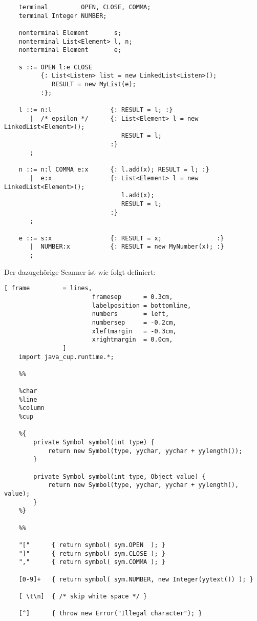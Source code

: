 \documentclass{article}
\begin{document}
\begin{enumerate}
\begin{Verbatim}
    terminal         OPEN, CLOSE, COMMA;
    terminal Integer NUMBER;
    
    nonterminal Element       s;
    nonterminal List<Element> l, n;
    nonterminal Element       e;
    
    s ::= OPEN l:e CLOSE  
          {: List<Listen> list = new LinkedList<Listen>();
             RESULT = new MyList(e);
          :};
    
    l ::= n:l                {: RESULT = l; :}
       |  /* epsilon */      {: List<Element> l = new LinkedList<Element>(); 
                                RESULT = l; 
                             :}
       ;
    
    n ::= n:l COMMA e:x      {: l.add(x); RESULT = l; :}
       |  e:x                {: List<Element> l = new LinkedList<Element>(); 
                                l.add(x);
                                RESULT = l; 
                             :}
       ;
    
    e ::= s:x                {: RESULT = x;               :}
       |  NUMBER:x           {: RESULT = new MyNumber(x); :}
       ;
      \end{Verbatim}
      \pagebreak

      Der dazugeh\"orige Scanner ist wie folgt definiert:
      \begin{Verbatim}[ frame         = lines, 
                        framesep      = 0.3cm, 
                        labelposition = bottomline,
                        numbers       = left,
                        numbersep     = -0.2cm,
                        xleftmargin   = -0.3cm,
                        xrightmargin  = 0.0cm,
                ]
    import java_cup.runtime.*;
          
    %%
       
    %char
    %line
    %column
    %cup
       
    %{   
        private Symbol symbol(int type) {
            return new Symbol(type, yychar, yychar + yylength());
        }
        
        private Symbol symbol(int type, Object value) {
            return new Symbol(type, yychar, yychar + yylength(), value);
        }
    %}
       
    %%
       
    "["      { return symbol( sym.OPEN  ); }
    "]"      { return symbol( sym.CLOSE ); }
    ","      { return symbol( sym.COMMA ); }
    
    [0-9]+   { return symbol( sym.NUMBER, new Integer(yytext()) ); }
    
    [ \t\n]  { /* skip white space */ }   
    
    [^]      { throw new Error("Illegal character"); }
       \end{Verbatim}

\end{enumerate}
\pagebreak
\end{document}
